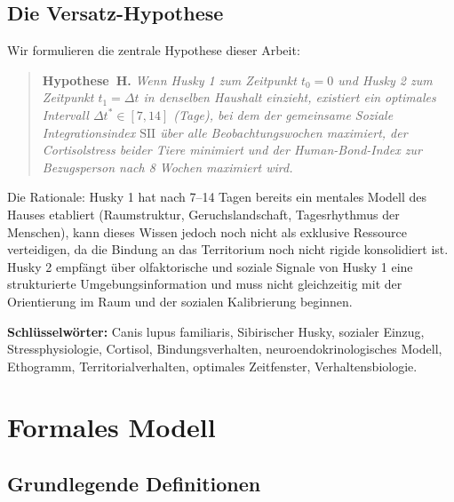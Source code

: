 ﻿\documentclass[12pt, a4paper]{article}
\theoremstyle{plain}
\theoremstyle{definition}
\theoremstyle{remark}
\newcommand{\SII}{\mathrm{SII}}
\newcommand{\dt}{\Delta t}
\begin{document}
\subsection{Die Versatz-Hypothese}

Wir formulieren die zentrale Hypothese dieser Arbeit:

\begin{quote}
\textbf{Hypothese~H.} \itshape Wenn Husky 1 zum Zeitpunkt $t_0 = 0$ und Husky 2 zum Zeitpunkt
$t_1 = \dt$ in denselben Haushalt einzieht, existiert ein optimales Intervall
$\dt^* \in [7, 14]$ (Tage), bei dem der gemeinsame Soziale Integrationsindex
$\SII$ über alle Beobachtungswochen maximiert, der Cortisolstress beider Tiere
minimiert und der Human-Bond-Index zur Bezugsperson nach 8 Wochen maximiert
wird.
\end{quote}

Die Rationale: Husky 1 hat nach 7--14 Tagen bereits ein mentales Modell des
Hauses etabliert (Raumstruktur, Geruchslandschaft, Tagesrhythmus der Menschen),
kann dieses Wissen jedoch noch nicht als exklusive Ressource verteidigen, da
die Bindung an das Territorium noch nicht rigide konsolidiert ist. Husky 2
empfängt über olfaktorische und soziale Signale von Husky 1 eine strukturierte
Umgebungsinformation und muss nicht gleichzeitig mit der Orientierung im Raum
und der sozialen Kalibrierung beginnen.

\textbf{Schlüsselwörter:} Canis lupus familiaris, Sibirischer Husky,
sozialer Einzug, Stressphysiologie, Cortisol, Bindungsverhalten,
neuroendokrinologisches Modell, Ethogramm, Territorialverhalten, optimales
Zeitfenster, Verhaltensbiologie.

\section{Formales Modell}
\label{sec:modell}

\subsection{Grundlegende Definitionen}
\end{document}

